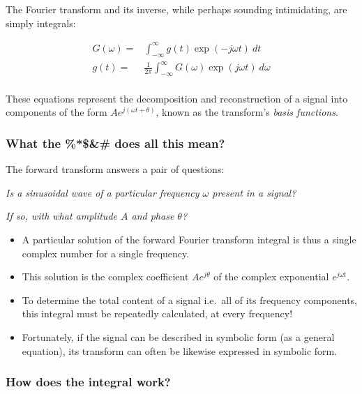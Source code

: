 \documentclass[11pt,letterpaper,draft]{exam}
\begin{document}
The Fourier transform and its inverse, while perhaps sounding
intimidating, are simply integrals:

\begin{equation}
\begin{split}
G(\omega) =& \int^{\infty}_{-\infty}g(t)\exp(-j\omega t)~ dt\\
g(t) =& \frac{1}{2\pi}\int^{\infty}_{-\infty}G(\omega)\exp(j\omega t)~ d\omega\\
\end{split}
\end{equation}

These equations represent the decomposition and reconstruction of a
signal into components of the form  $Ae^{j(\omega t + \theta)}$, known
as the transform's \textit{basis functions}.

\subsubsection*{What the \%*\$\&\# does all this mean?}

The forward transform answers a pair of questions:

\textit{Is a sinusoidal wave of a particular frequency 
$\omega$ present in a signal?}

\textit{If so, with what amplitude $A$ and phase $\theta$?}

\begin{itemize}
\item A particular solution of the forward Fourier transform integral
is thus a
single complex number for a single frequency.  

\item This solution is the complex coefficient $Ae^{j \theta}$ of the complex exponential $e^{j\omega t}$.

\item To determine the total content of a signal i.e.\ all of its frequency
components, this integral must be repeatedly calculated, at every frequency!

\item Fortunately, if the signal can be described in symbolic form (as
a general equation), its
transform can often be likewise expressed in symbolic form.
\end{itemize}

\subsubsection*{How does the integral work?}
\end{document}
